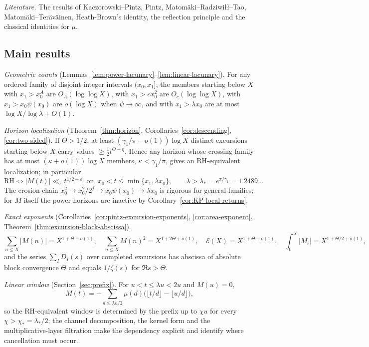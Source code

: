 \documentclass[11pt]{amsart}
\numberwithin{equation}{section}
\theoremstyle{plain}
\theoremstyle{definition}
\theoremstyle{remark}
\newcommand{\Ms}{M_{\mathrm{s}}}
\newcommand{\eps}{\varepsilon}
\newcommand{\En}{\mathcal{E}}
\begin{document}
\smallskip\noindent\emph{Literature.} The results of
Kaczorowski--Pintz, Pintz, Matomäki--Radziwiłł--Tao, Matomäki--Teräväinen,
Heath-Brown's identity, the reflection principle and the classical
identities for $\mu$.

\subsection{Main results}
\emph{Geometric counts} (Lemmas~\ref{lem:power-lacunary}--\ref{lem:linear-lacunary}).
For any ordered family of disjoint integer intervals $(x_0,x_1]$, the members
starting below $X$ with $x_1>x_0^A$ are $O_A(\log\log X)$, with $x_1>cx_0^2$
are $O_c(\log\log X)$, with $x_1>x_0\psi(x_0)$ are $o(\log X)$ when
$\psi\to\infty$, and with $x_1>\lambda x_0$ are at most
$\log X/\log\lambda+O(1)$.

\emph{Horizon localization} (Theorem~\ref{thm:horizon},
Corollaries~\ref{cor:descending}, \ref{cor:two-sided}). If $\Theta>1/2$, at
least $(\gamma_1/\pi-o(1))\log X$ distinct excursions starting below $X$
carry values $\ge\frac12t^{\Theta-\eta}$. Hence any horizon whose crossing
family has at most $(\kappa+o(1))\log X$ members, $\kappa<\gamma_1/\pi$, gives
an RH-equivalent localization; in particular
\[
\mathrm{RH}\iff |M(t)|\ll_\eps t^{1/2+\eps}\ \text{ on }\
x_0<t\le\min\{x_1,\lambda x_0\},\qquad \lambda>\lambda_*=e^{\pi/\gamma_1}=1.2489\ldots
\]
The erosion chain $x_0^2\to x_0^2/2^j\to x_0\psi(x_0)\to\lambda x_0$ is
rigorous for general families; for $M$ itself the power horizons are
inactive by Corollary~\ref{cor:KP-local-returns}.

\emph{Exact exponents} (Corollaries~\ref{cor:pintz-excursion-exponents},
\ref{cor:area-exponent}, Theorem~\ref{thm:excursion-block-abscissa}).
\[
\sum_{n\le X}|M(n)|=X^{1+\Theta+o(1)},\quad \sum_{n\le X}M(n)^2=X^{1+2\Theta+o(1)},\quad
\En(X)=X^{1+\Theta+o(1)},\quad \int_0^X|\Ms|=X^{1+\Theta/2+o(1)},
\]
and the series $\sum_I D_I(s)$ over completed excursions has abscissa of
absolute block convergence $\Theta$ and equals $1/\zeta(s)$ for
$\Re s>\Theta$.

\emph{Linear window} (Section~\ref{sec:prefix}). For $u<t\le\lambda u<2u$ and
$M(u)=0$,
\[
M(t)=-\sum_{d\le\lambda u/2}\mu(d)\bigl(\lfloor t/d\rfloor-\lfloor u/d\rfloor\bigr),
\]
so the RH-equivalent window is determined by the prefix up to $\chi u$ for
every $\chi>\chi_*=\lambda_*/2$; the channel decomposition, the kernel form
and the multiplicative-layer filtration make the dependency explicit and
identify where cancellation must occur.
\end{document}
